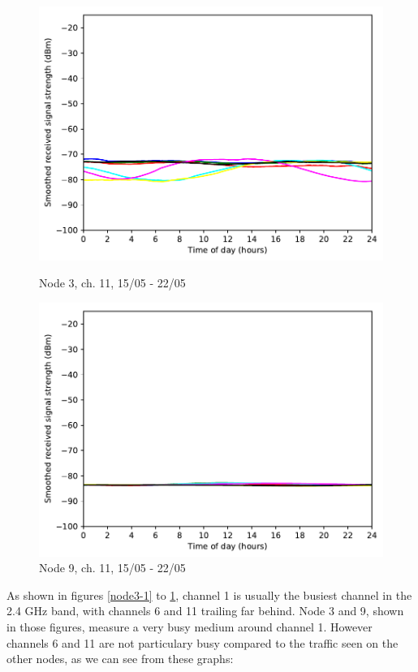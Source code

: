 \documentclass[a4paper, 11pt]{article}
\begin{document}
\begin{figure}
\begin{minipage}{0.47\textwidth}
	\includegraphics[width=\textwidth]{images/2_4_GHz/cot-node3-student_2017-05-21_chan11_image}
    \caption{Node 3, ch. 11, 15/05 - 22/05} \label{node3-11}
\end{minipage}\hfill
\begin{minipage}{0.47\textwidth}
    \centering
	\includegraphics[width=\textwidth]{images/2_4_GHz/cot-node9-student_2017-05-21_chan11_image}
    \caption{Node 9, ch. 11, 15/05 - 22/05} \label{node9-11}
\end{minipage}\hfill
\end{figure}



As shown in figures \ref{node3-1} to \ref{node9-11}, channel 1 is usually the busiest channel in the 2.4 GHz band, with channels 6 and 11 trailing far behind. Node 3 and 9, shown in those figures, measure a very busy medium around channel 1. However channels 6 and 11 are not particulary busy compared to the traffic seen on the other nodes, as we can see from these graphs:\\
\end{document}
